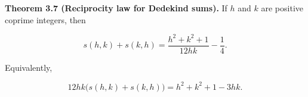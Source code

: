 \textbf{Theorem 3.7 (Reciprocity law for Dedekind sums).}
If $h$ and $k$ are positive coprime integers, then

$$
s(h, k) + s(k, h) = \frac{h^2 + k^2 + 1}{12hk} - \frac{1}{4}.
$$

Equivalently,

$$
12hk\bigl(s(h, k) + s(k, h)\bigr) = h^2 + k^2 + 1 - 3hk.
$$
